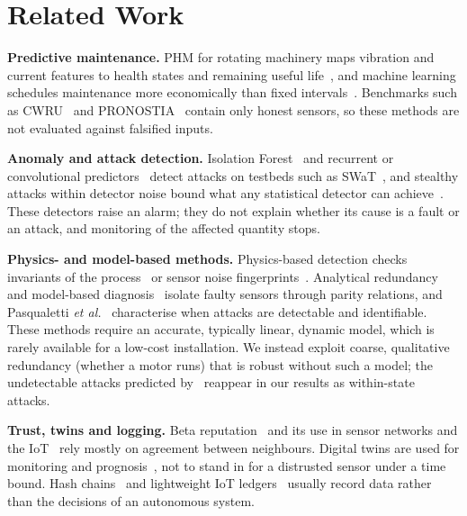 \documentclass[conference]{IEEEtran}
\begin{document}
\section{Related Work}

\textbf{Predictive maintenance.} PHM for rotating machinery maps vibration and current features to health states and remaining useful life~\cite{lee2014phm,zhao2019dlhealth}, and machine learning schedules maintenance more economically than fixed intervals~\cite{susto2015pdm}. Benchmarks such as CWRU~\cite{smith2015cwru} and PRONOSTIA~\cite{nectoux2012pronostia} contain only honest sensors, so these methods are not evaluated against falsified inputs.

\textbf{Anomaly and attack detection.} Isolation Forest~\cite{liu2008iforest} and recurrent or convolutional predictors~\cite{malhotra2015lstm,goh2017rnn,kravchik2018cnn} detect attacks on testbeds such as SWaT~\cite{goh2016swat}, and stealthy attacks within detector noise bound what any statistical detector can achieve~\cite{urbina2016stealthy}. These detectors raise an alarm; they do not explain whether its cause is a fault or an attack, and monitoring of the affected quantity stops.

\textbf{Physics- and model-based methods.} Physics-based detection checks invariants of the process~\cite{giraldo2018physics} or sensor noise fingerprints~\cite{ahmed2018noise}. Analytical redundancy~\cite{chow1984redundancy} and model-based diagnosis~\cite{isermann2005fdd} isolate faulty sensors through parity relations, and Pasqualetti \emph{et al.}~\cite{pasqualetti2013identification} characterise when attacks are detectable and identifiable. These methods require an accurate, typically linear, dynamic model, which is rarely available for a low-cost installation. We instead exploit coarse, qualitative redundancy (whether a motor runs) that is robust without such a model; the undetectable attacks predicted by~\cite{pasqualetti2013identification} reappear in our results as within-state attacks.

\textbf{Trust, twins and logging.} Beta reputation~\cite{josang2002beta} and its use in sensor networks and the IoT~\cite{ganeriwal2008reputation,bao2012dynamic} rely mostly on agreement between neighbours. Digital twins are used for monitoring and prognosis~\cite{tao2019twin}, not to stand in for a distrusted sensor under a time bound. Hash chains~\cite{haber1991timestamp} and lightweight IoT ledgers~\cite{dorri2017optimized} usually record data rather than the decisions of an autonomous system.
\end{document}
